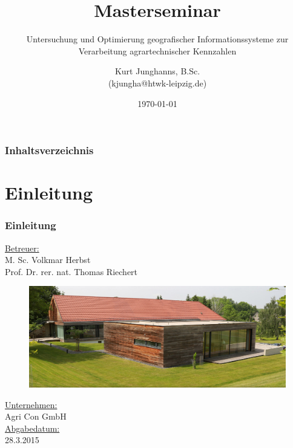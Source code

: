 \documentclass{beamer}
\begin{document}
\title{Masterseminar}
\subtitle{Untersuchung und Optimierung geografischer Informationssysteme zur Verarbeitung agrartechnischer Kennzahlen} 
\author{Kurt Junghanns, B.Sc. \\(kjungha@htwk-leipzig.de)} 
\date{\today}
 
\begin{frame}
\titlepage
\end{frame}

\begin{frame}
\frametitle{Inhaltsverzeichnis}\tableofcontents
\end{frame}

\section{Einleitung}
\begin{frame}\frametitle{Einleitung}
\underline{Betreuer:}\\
M. Sc. Volkmar Herbst\\
Prof. Dr. rer. nat. Thomas Riechert\\
\vspace{\baselineskip}
\begin{figure}\centering
    \includegraphics[scale=0.2]{Firma.png}
\end{figure}
\underline{Unternehmen:}\\
Agri Con GmbH\\
\vspace{\baselineskip}
\underline{Abgabedatum:}\\
28.3.2015
\end{frame}
\end{document}
